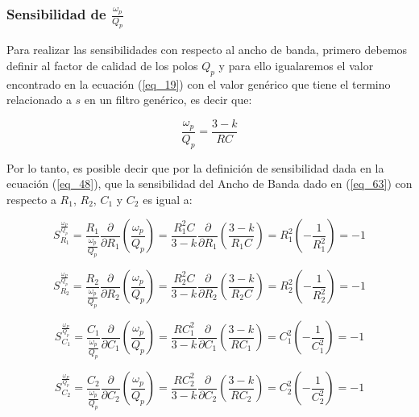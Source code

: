 \documentclass[12pt,a4paper]{article}
\begin{document}
\subsubsection{Sensibilidad de $\frac{\omega_{p}}{Q_{p}}$}
Para realizar las sensibilidades con respecto al ancho de banda, primero debemos definir al factor de calidad de los polos $Q_{p}$ y para ello igualaremos el valor encontrado en la ecuación (\ref{eq_19}) con el valor genérico que tiene el termino relacionado a $s$ en un filtro genérico, es decir que:

\begin{equation}
    \label{eq_63}
    \frac{\omega_{p}}{Q_{p}} = \frac{3 - k}{RC}
\end{equation}

Por lo tanto, es posible decir que por la definición de sensibilidad dada en la ecuación (\ref{eq_48}), que la sensibilidad del Ancho de Banda dado en (\ref{eq_63}) con respecto a $R_{1}$, $R_{2}$, $ C_{1}$ y $C_{2}$ es igual a:

\begin{equation}
    \label{eq_64}
    S_{R_{1}}^{\frac{\omega_{P}}{Q_{p}}} = \frac{R_1}{\frac{\omega_{p}}{Q_{p}}} \frac{\partial}{\partial R_{1}} \left(\frac{\omega_{p}}{Q_{p}}\right) = \frac{R_{1}^{2}C}{3 - k} \frac{\partial}{\partial R_1} \left(\frac{3 - k}{R_{1}C}\right) = R_{1}^{2} \left(-\frac{1}{R_{1}^2}\right) = - 1
\end{equation}

\begin{equation}
    \label{eq_65}
    S_{R_{2}}^{\frac{\omega_{P}}{Q_{p}}} = \frac{R_2}{\frac{\omega_{p}}{Q_{p}}} \frac{\partial}{\partial R_{2}} \left(\frac{\omega_{p}}{Q_{p}}\right) = \frac{R_{2}^{2}C}{3 - k} \frac{\partial}{\partial R_2} \left(\frac{3 - k}{R_{2}C}\right) = R_{2}^{2} \left(-\frac{1}{R_{2}^2}\right) = - 1
\end{equation}

\begin{equation}
    \label{eq_66}
    S_{C_{1}}^{\frac{\omega_{P}}{Q_{p}}} = \frac{C_1}{\frac{\omega_{p}}{Q_{p}}} \frac{\partial}{\partial C_{1}} \left(\frac{\omega_{p}}{Q_{p}}\right) = \frac{RC_{1}^{2}}{3 - k} \frac{\partial}{\partial C_1} \left(\frac{3 - k}{RC_{1}}\right) = C_{1}^{2} \left(-\frac{1}{C_{1}^2}\right) = - 1
\end{equation}

\begin{equation}
    \label{eq_67}
    S_{C_{2}}^{\frac{\omega_{P}}{Q_{p}}} = \frac{C_2}{\frac{\omega_{p}}{Q_{p}}} \frac{\partial}{\partial C_{2}} \left(\frac{\omega_{p}}{Q_{p}}\right) = \frac{RC_{2}^{2}}{3 - k} \frac{\partial}{\partial C_2} \left(\frac{3 - k}{RC_{2}}\right) = C_{2}^{2} \left(-\frac{1}{C_{2}^2}\right) = - 1
\end{equation}
\end{document}
